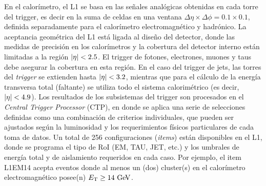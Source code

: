 En el calorímetro, el L1 se basa en las señales analógicas obtenidas en cada
torre del trigger, es decir en la suma de celdas en una ventana $\Delta \eta \times \Delta
\phi = 0.1 \times 0.1$, definida separadamente para el calorímetro electromagnético y
hadrónico.
La aceptancia geométrica del L1 está ligada al diseño del detector, donde las medidas de precisión en los
calorímetros y la cobertura del detector interno están limitadas a la región
$\abseta < 2.5$. El trigger de fotones, electrones, muones y taus debe asegurar
la cobertura en esta región. En el caso del trigger de jets, las torres del \emph{trigger}
se extienden hasta $\abseta < 3.2$, mientras que para el cálculo de la energía
transversa total (faltante) se utiliza todo el sistema calorimétrico (es decir,
$\abseta < 4.9$). Los resultados de los subsistemas del trigger son procesados
en el \emph{Central Trigger Processor} (CTP), en donde se aplica una serie de
selecciones definidas como una combinación de criterios
individuales, que pueden ser ajustados según la luminosidad y los requerimientos
físicos particulares de cada toma de datos. Un total de 256 configuraciones
(\emph{items}) están disponibles en el L1, donde se programa el tipo de RoI (EM,
TAU, JET, etc.) y los umbrales de energía total y de aislamiento requeridos en
cada caso. Por ejemplo, el item L1EM14 acepta eventos donde al menos un (dos)
cluster(s) en el calorímetro electromagnético posee(n) $\et \geq 14 \GeV$.

